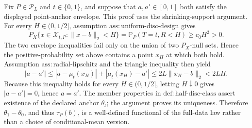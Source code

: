 Fix \(P\in\mathcal P_L\) and \(t\in\{0,1\}\), and suppose that \(a,a'\in[0,1]\) both satisfy the displayed point-anchor envelope.  This proof uses the shrinking-support argument.  For every \(H\in(0,1/2]\), assumption \(\mathrm{ass:uniform\text{-}disc\text{-}design}\) gives
\[
 P_X\{x\in\mathcal X_{t,P}:\lVert x-b\rVert_2<H\}
 =\mathbb P_P(T=t,R<H)\ge c_0H^2>0.
\]
The two envelope inequalities fail only on the union of two \(P_X\)-null sets.  Hence the positive-probability set above contains a point \(x_H\) at which both hold.  Assumption \(\mathrm{ass:radial\text{-}lipschitz}\) and the triangle inequality then yield
\[
 |a-a'|
 \le |a-\mu_t(x_H)|+|\mu_t(x_H)-a'|
 \le 2L\lVert x_H-b\rVert_2
 <2LH.
\]
Because this inequality holds for every \(H\in(0,1/2]\), letting \(H\downarrow0\) gives \(|a-a'|=0\), hence \(a=a'\).  The member properties in \(\mathrm{def:half\text{-}disc\text{-}class}\) assert existence of the declared anchor \(\theta_t\); the argument proves its uniqueness.  Therefore \(\theta_1-\theta_0\), and thus \(\tau_P(b)\), is a well-defined functional of the full-data law rather than a choice of conditional-mean version.